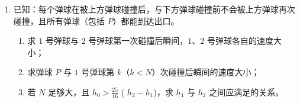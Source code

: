 \begin{enumerate}
\begin{enumerate}
\item
已知：每个弹球在被上方弹球碰撞后，与下方弹球碰撞前不会被上方弹球再次碰撞，且所有弹球（包括 $ P $）都能到达出口。
\begin{enumerate}
	\item 
求 $ 1 $ 号弹球与 $ 2 $ 号弹球第一次碰撞后瞬间，$ 1 $、$ 2 $ 号弹球各自的速度大小；
\item 
求弹球 $ P $ 与 $ 1 $ 号弹球第 $ k $（$k < N$）次碰撞后瞬间的速度大小；
\item 
若 $ N $ 足够大，且 $h_{0} > \frac{{25}}{{16}}$ ( $h_{2} - h_{1}$)，求 $ h_{1} $ 与 $ h_{2} $ 之间应满足的关系。
\end{enumerate}
\end{enumerate}
\begin{figure}[htbp]
	\raggedleft
	
\end{figure}
\end{enumerate}
